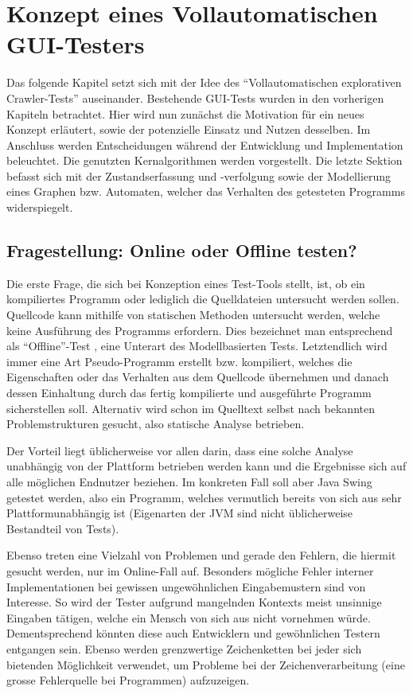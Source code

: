 \chapter{Konzept eines Vollautomatischen GUI-Testers}\label{chapter:conceptfullautoguitesting}


Das folgende Kapitel setzt sich mit der Idee des ``Vollautomatischen explorativen Crawler-Tests''
auseinander. Bestehende GUI-Tests wurden in den vorherigen Kapiteln betrachtet. Hier wird nun zunächst 
die Motivation für ein neues Konzept erläutert, sowie der potenzielle Einsatz und Nutzen desselben.
Im Anschluss werden Entscheidungen während der Entwicklung und Implementation beleuchtet.
Die genutzten Kernalgorithmen werden vorgestellt. Die letzte Sektion befasst sich mit der
Zustandserfassung und -verfolgung sowie der Modellierung eines Graphen bzw. Automaten, welcher
das Verhalten des getesteten Programms widerspiegelt.


\section{Fragestellung: Online oder Offline testen?}\label{section:offoronlinetesting}


Die erste Frage, die sich bei Konzeption eines Test-Tools stellt, ist, ob ein kompiliertes Programm
oder lediglich die Quelldateien untersucht werden sollen. Quellcode kann mithilfe von statischen
Methoden untersucht werden, welche keine Ausführung des Programms erfordern. Dies bezeichnet man
entsprechend als ``Offline''-Test \cite{offlinetesting}, eine Unterart des Modellbasierten Tests.
Letztendlich wird immer eine Art Pseudo-Programm erstellt bzw. kompiliert, welches die
Eigenschaften oder das Verhalten aus dem Quellcode übernehmen und danach dessen Einhaltung durch
das fertig kompilierte und ausgeführte Programm sicherstellen soll. Alternativ wird schon
im Quelltext selbst nach bekannten Problemstrukturen gesucht, also statische Analyse betrieben.

Der Vorteil liegt üblicherweise vor allen darin, dass eine solche Analyse unabhängig von der
Plattform betrieben werden kann und die Ergebnisse sich auf alle möglichen Endnutzer beziehen.
Im konkreten Fall soll aber Java Swing getestet werden, also ein Programm, welches vermutlich
bereits von sich aus sehr Plattformunabhängig ist (Eigenarten der JVM sind nicht üblicherweise
Bestandteil von Tests).

Ebenso treten eine Vielzahl von Problemen und gerade den Fehlern, die hiermit gesucht werden,
nur im Online-Fall auf. Besonders mögliche Fehler interner Implementationen bei gewissen ungewöhnlichen
Eingabemustern sind von Interesse. So wird der Tester aufgrund mangelnden Kontexts meist unsinnige
Eingaben tätigen, welche ein Mensch von sich aus nicht vornehmen würde. Dementsprechend könnten
diese auch Entwicklern und gewöhnlichen Testern entgangen sein. Ebenso werden grenzwertige
Zeichenketten bei jeder sich bietenden Möglichkeit verwendet, um Probleme bei der Zeichenverarbeitung
(eine grosse Fehlerquelle bei Programmen) aufzuzeigen.

